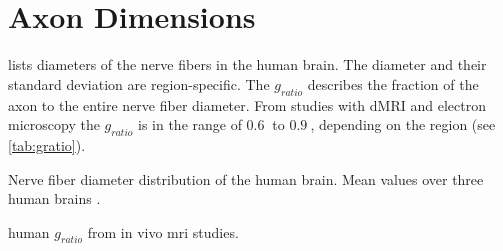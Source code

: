 \section{Axon Dimensions}
\label{sec:axonMicroscopy}
%
 lists diameters of the nerve fibers in the human brain.
The diameter and their standard deviation are region-specific.
The $g_{\mathit{ratio}}$ describes the fraction of the axon to the entire nerve fiber diameter.
From studies with \ac{dMRI} and electron microscopy the $g_{\mathit{ratio}}$ is in the range of $\SI{0.6}{}$ to $\SI{0.9}{}$, depending on the region (see \cref{tab:gratio}).
%
\begin{table}[!b]
\centering
{}
\caption[]{Nerve fiber diameter distribution of the human brain.
    Mean values over three human brains \cite{Liewald2014}.}
\label{tab:axonDiameter}
\end{table}
%
\begin{table}[!b]
\centering
{}
\caption[]{human $g_{\mathit{ratio}}$ from in vivo mri studies.}
\label{tab:gratio}
\end{table}
